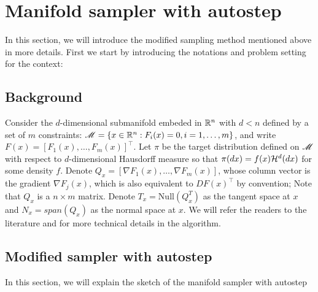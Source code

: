 \documentclass{article}
\begin{document}


\section{Manifold sampler with autostep}
In this section, we will introduce the modified sampling method mentioned above in more details. First we start by introducing the notations and problem setting for the context:
\subsection{Background}
Consider the $d$-dimensional submanifold embeded in $\mathbb R^n$ with $d < n$ defined by a set of $m$ constraints: $\mathscr{M} = \{x \in \mathbb R^n : F_i(x) = 0, i = 1,\ldots, m\}$, and write $F(x) = [F_1(x),\ldots, F_m(x)]^\top$. Let $\pi$ be the target distribution defined on $\mathscr{M}$ with respect to $d$-dimensional Hausdorff measure so that $\pi(dx) = f(x) {\cal H}^{d}(dx)$ for some density $f$.
Denote $Q_x = [\nabla F_1(x), \ldots, \nabla F_m(x)]$, whose column vector is the gradient $\nabla F_j(x)$, which is also equivalent to $DF(x)^\top$ by convention; Note that $Q_x$ is a $n \times m$ matrix. Denote $T_x = \text{Null}(Q_x^T)$ as the tangent space at $x$ and $N_x = span(Q_x)$ as the normal space at $x$. We will refer the readers to the literature \cite{manifoldparent} and \cite{manifoldchild} for more technical details in the algorithm.

\subsection{Modified sampler with autostep}
In this section, we will explain the sketch of the manifold sampler with autostep
\end{document}
